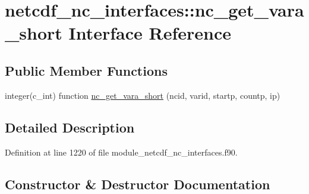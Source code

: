 \hypertarget{interfacenetcdf__nc__interfaces_1_1nc__get__vara__short}{}\section{netcdf\+\_\+nc\+\_\+interfaces\+:\+:nc\+\_\+get\+\_\+vara\+\_\+short Interface Reference}
\label{interfacenetcdf__nc__interfaces_1_1nc__get__vara__short}
\subsection*{Public Member Functions}
\begin{DoxyCompactItemize}
\item 
integer(c\+\_\+int) function \hyperlink{interfacenetcdf__nc__interfaces_1_1nc__get__vara__short_a35a252281392442aaca0548ae35a7835}{nc\+\_\+get\+\_\+vara\+\_\+short} (ncid, varid, startp, countp, ip)
\end{DoxyCompactItemize}


\subsection{Detailed Description}


Definition at line 1220 of file module\+\_\+netcdf\+\_\+nc\+\_\+interfaces.\+f90.



\subsection{Constructor \& Destructor Documentation}
\mbox{\label{interfacenetcdf__nc__interfaces_1_1nc__get__vara__short_a35a252281392442aaca0548ae35a7835}} 
